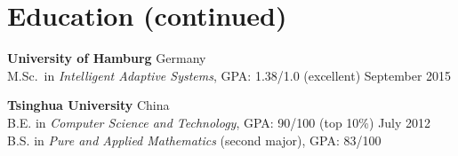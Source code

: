 \documentclass[a4paper,9pt]{extarticle} %
\newcommand{\ind}{\hspace*{1em}}
\begin{document}
\pagebreak
\section*{Education (continued)}

\parbox{\textwidth}{%
\textbf{University of Hamburg} \hfill Germany \\
\ind{} M.Sc.\ in \textit{Intelligent Adaptive Systems}, GPA\@: 1.38/1.0 (excellent)  \hfill September 2015%
}

\parbox{\textwidth}{%
\textbf{Tsinghua University} \hfill China \\
\ind{} B.E. in \textit{Computer Science and Technology}, GPA\@: 90/100 (top 10\%) \hfill July 2012 \\
\ind{} B.S. in \textit{Pure and Applied Mathematics} (second major), GPA\@: 83/100 %
}

\end{document}
